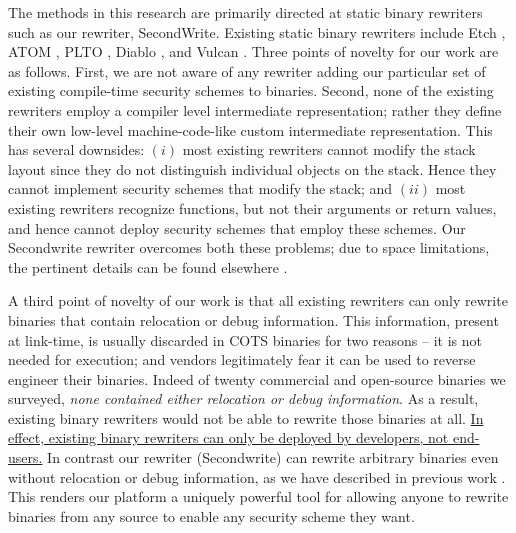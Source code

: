 The methods in this research are primarily directed at static binary
rewriters such as our rewriter, SecondWrite. Existing static binary
rewriters include Etch \cite{etch}, ATOM \cite{atom}, PLTO
\cite{plto}, Diablo \cite{Diablo1}, and Vulcan \cite{vulcan}. Three
points of novelty for our work are as follows. First, we are not aware
of any rewriter adding our particular set of existing compile-time
security schemes to binaries. Second, none of the existing rewriters
employ a compiler level intermediate representation; rather they
define their own low-level machine-code-like custom intermediate
representation. This has several downsides: $(i)$ most existing
rewriters cannot modify the stack layout since they do not distinguish
individual objects on the stack. Hence they cannot implement security
schemes that modify the stack; and $(ii)$ most existing rewriters
recognize functions, but not their arguments or return values, and
hence cannot deploy security schemes that employ these schemes. Our
Secondwrite rewriter overcomes both these problems; due to space
limitations, the pertinent details can be found elsewhere
\cite{blind-kapil}.

A third point of novelty of our work is that all existing rewriters
can only rewrite binaries that contain relocation or debug
information.  This information, present at link-time, is usually
discarded in COTS binaries for two reasons -- it is not needed for
execution; and vendors legitimately fear it can be used to reverse
engineer their binaries.  Indeed of twenty commercial and open-source
binaries we surveyed, \emph{none contained either relocation or debug
  information}.  As a result, existing binary rewriters would not be
able to rewrite those binaries at all.  \underline{In effect, existing
  binary rewriters can only be deployed by developers, not end-users.}
In contrast our rewriter (Secondwrite) can rewrite arbitrary binaries
even without relocation or debug information, as we have described in
previous work \cite{blind-matt}.  This renders our platform a uniquely
powerful tool for allowing anyone to rewrite binaries from any source
to enable any security scheme they want.

